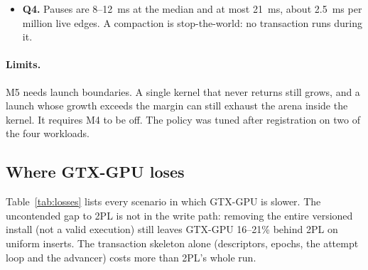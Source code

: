 \documentclass[sigconf,nonacm]{acmart}
\newcommand{\sys}{GTX-GPU}
\begin{document}
\begin{itemize}
every vertex, and the first warp-per-vertex kernels. Every round is history-checked from the state before
compaction, and all 110 cases pass. The checker rejects two of the three registered mutations (drop one live edge
per vertex, keep invalidated versions). The third, compacting at $F{-}1$, is not observable at a launch boundary: the
last epoch normally holds no committed writer, so visibility at $F{-}1$ equals visibility at $F$ (Appendix proof
\S9). It is reported as informational. A substitute registered after the fact, a stale frontier $F/2$, is rejected.
\item \textbf{Q4.} Pauses are 8--12~ms at the median and at most 21~ms, about 2.5~ms per million live edges. A
compaction is stop-the-world: no transaction runs during it.
\end{itemize}

\paragraph{Limits.} M5 needs launch boundaries. A single kernel that never returns still grows, and a launch whose
growth exceeds the margin can still exhaust the arena inside the kernel. It requires M4 to be off. The policy was
tuned after registration on two of the four workloads.

\subsection{Where \sys{} loses}
\label{sec:losses}
Table~\ref{tab:losses} lists every scenario in which \sys{} is slower. The uncontended gap to 2PL is not in the write
path: removing the entire versioned install (not a valid execution) still leaves \sys{} 16--21\% behind 2PL on
uniform inserts. The transaction skeleton alone (descriptors, epochs, the attempt loop and the advancer) costs more
than 2PL's whole run.
\end{document}
